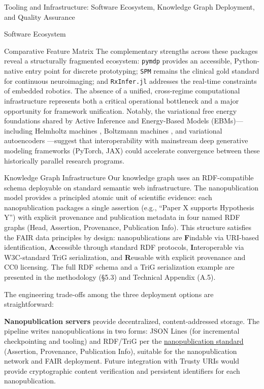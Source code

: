 \documentclass[
  ignorenonframetext,
]{beamer}
\begin{document}
\begin{frame}[fragile]{Tooling and Infrastructure: Software Ecosystem,
Knowledge Graph Deployment, and Quality Assurance \label{sec:tooling}}
\begin{block}{Software Ecosystem}
\begin{block}{Comparative Feature Matrix}
The complementary strengths across these packages reveal a structurally
fragmented ecosystem: \texttt{pymdp} provides an accessible,
Python-native entry point for discrete prototyping; \texttt{SPM} remains
the clinical gold standard for continuous neuroimaging; and
\texttt{RxInfer.jl} addresses the real-time constraints of embedded
robotics. The absence of a unified, cross-regime computational
infrastructure represents both a critical operational bottleneck and a
major opportunity for framework unification. Notably, the variational
free energy foundations shared by Active Inference and Energy-Based
Models (EBMs)---including Helmholtz machines \citep{dayan1995helmholtz},
Boltzmann machines \citep{hinton2002training}, and variational
autoencoders \citep{kingma2014auto}---suggest that interoperability with
mainstream deep generative modeling frameworks (PyTorch, JAX) could
accelerate convergence between these historically parallel research
programs.
\end{block}
\end{block}

\begin{block}{Knowledge Graph Infrastructure}
\protect{}\label{knowledge-graph-infrastructure}
Our knowledge graph uses an RDF-compatible schema deployable on standard
semantic web infrastructure. The nanopublication model
\citep{groth2010anatomy, kuhn2016decentralized} provides a principled
atomic unit of scientific evidence: each nanopublication packages a
single assertion (e.g., ``Paper X supports Hypothesis Y'') with explicit
provenance and publication metadata in four named RDF graphs (Head,
Assertion, Provenance, Publication Info). This structure satisfies the
FAIR data principles by design: nanopublications are \textbf{F}indable
via URI-based identification, \textbf{A}ccessible through standard RDF
protocols, \textbf{I}nteroperable via W3C-standard TriG serialization,
and \textbf{R}eusable with explicit provenance and CC0 licensing. The
full RDF schema and a TriG serialization example are presented in the
methodology (§5.3) and Technical Appendix (A.5).

The engineering trade-offs among the three deployment options are
straightforward:

\textbf{Nanopublication servers} provide decentralized,
content-addressed storage. The pipeline writes nanopublications in two
forms: JSON Lines (for incremental checkpointing and tooling) and
RDF/TriG per the \href{https://nanopub.net/}{nanopublication standard}
(Assertion, Provenance, Publication Info), suitable for the
nanopublication network and FAIR deployment. Future integration with
Trusty URIs \citep{kuhn2014trusty} would provide cryptographic content
verification and persistent identifiers for each nanopublication.


\end{block}
\end{frame}
\end{document}
